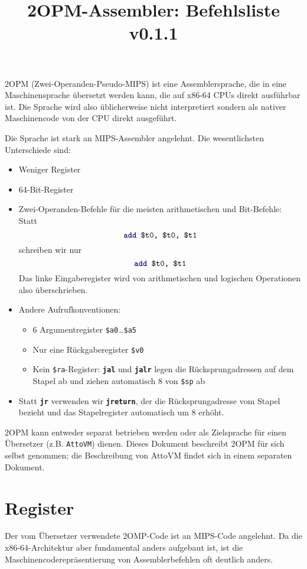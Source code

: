 \documentclass[11pt,a4paper]{article}
\title{2OPM-Assembler: Befehlsliste\\ \normalsize v0.1.1}
\newcommand{\textdbf}[1]{\texttt{\textcolor{dblue}{\textbf{#1}}}}
\begin{document}
\maketitle

2OPM (Zwei-Operanden-Pseudo-MIPS) ist eine Assemblersprache, die in eine Maschinensprache übersetzt werden kann,
die auf x86-64 CPUs direkt ausführbar ist.   Die Sprache wird also üblicherweise nicht
interpretiert sondern als nativer Maschinencode von der CPU direkt ausgeführt.

Die Sprache ist stark an MIPS-Assembler angelehnt.  Die wesentlichsten Unterschiede sind:
\begin{itemize}
\item Weniger Register
\item 64-Bit-Register
\item Zwei-Operanden-Befehle für die meisten arithmetischen und Bit-Befehle: Statt
\[
  \texttt{\textdbf{add} \$t0, \$t0, \$t1}
\]
    schreiben wir nur
\[
    \texttt{\textdbf{add} \$t0, \$t1}
\]
    Das linke Eingaberegister wird von arithmetischen und logischen Operationen also überschrieben.
\item Andere Aufrufkonventionen:
  \begin{itemize}
  \item 6 Argumentregister \texttt{\$a0}\ldots\texttt{\$a5}
  \item Nur eine Rückgaberegister \texttt{\$v0}
  \item Kein \texttt{\$ra}-Register: \textdbf{jal} und \textdbf{jalr} legen die Rücksprungadressen auf dem Stapel ab und ziehen
    automatisch 8 von \texttt{\$sp} ab
  \end{itemize}
  \item Statt \textdbf{jr} verwenden wir \textdbf{jreturn}, der die
    Rücksprungadresse vom Stapel bezieht und das Stapelregister
    automatisch um 8 erhöht.
\end{itemize}

2OPM kann entweder separat betrieben werden oder als Zielsprache für
einen Übersetzer (z.B. \texttt{AttoVM}) dienen.  Dieses Dokument
beschreibt 2OPM für sich selbst genommen; die Beschreibung von AttoVM
findet sich in einem separaten Dokument.

\section{Register}

  Der vom Übersetzer verwendete 2OMP-Code ist an MIPS-Code angelehnt.  Da die x86-64-Architektur aber
fundamental anders aufgebaut ist, ist die Maschinencoderepräsentierung von Assemblerbefehlen oft deutlich anders.
\end{document}
